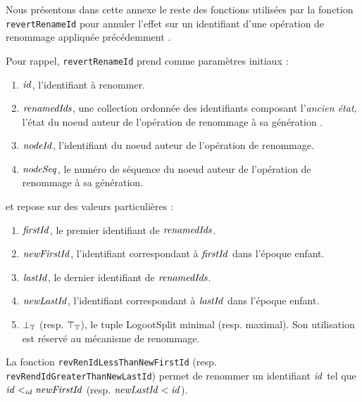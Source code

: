 \label{app:revert-rename-id}

Nous présentons dans cette annexe le reste des fonctions utilisées par la fonction \texttt{revertRenameId} pour annuler l'effet sur un identifiant d'une opération de renommage appliquée précédemment .

Pour rappel, \texttt{revertRenameId} prend comme paramètres initiaux :
\begin{enumerate}
    \item $\mathit{id}$, l'identifiant à renommer.
    \item $\mathit{renamedIds}$, une collection ordonnée des identifiants composant l'\emph{ancien état}, \ie l'état du noeud auteur de l'opération de renommage à sa génération .
    \item $\mathit{nodeId}$, l'identifiant du noeud auteur de l'opération de renommage.
    \item $\mathit{nodeSeq}$, le numéro de séquence du noeud auteur de l'opération de renommage à sa génération.
\end{enumerate}
et repose sur des valeurs particulières :
\begin{enumerate}
    \item $\mathit{firstId}$, le premier identifiant de $\mathit{renamedIds}$.
    \item $\mathit{newFirstId}$, l'identifiant correspondant à $\mathit{firstId}$ dans l'époque enfant.
    \item $\mathit{lastId}$, le dernier identifiant de $\mathit{renamedIds}$.
    \item $\mathit{newLastId}$, l'identifiant correspondant à $\mathit{lastId}$ dans l'époque enfant.
    \item $\bot_\mathbb{T}$ (resp. $\top_\mathbb{T}$), le tuple LogootSplit minimal (resp. maximal). Son utilisation est réservé au mécanisme de renommage.
\end{enumerate}

La fonction \texttt{revRenIdLessThanNewFirstId} (resp. \texttt{revRendIdGreaterThanNewLastId}) permet de renommer un identifiant $\mathit{id}$ tel que $\mathit{id} <_{id} \mathit{newFirstId}$ (resp. $\mathit{newLastId} < \mathit{id}$).

